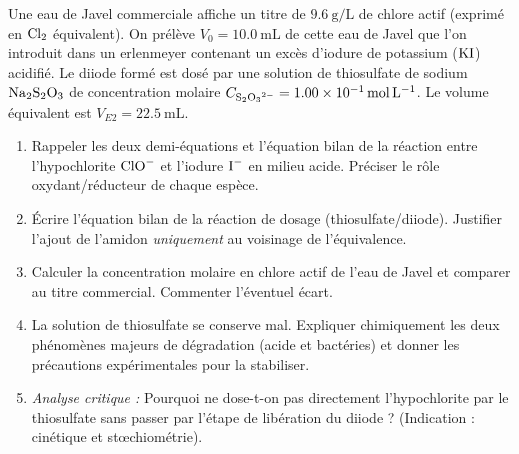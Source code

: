\documentclass[11pt]{article}
\begin{document}
\begin{exercice}
Une eau de Javel commerciale affiche un titre de $\SI{9,6}{\gram\per\L}$ de chlore actif (exprimé en $\ce{Cl2}$ équivalent). On prélève $V_0 = \SI{10,0}{\mL}$ de cette eau de Javel que l'on introduit dans un erlenmeyer contenant un excès d'iodure de potassium ($\ce{KI}$) acidifié. Le diiode formé est dosé par une solution de thiosulfate de sodium $\ce{Na2S2O3}$ de concentration molaire $C_{\ce{S2O3^{2-}}} = \SI{1,00e-1}{\mol\per\L}$. Le volume équivalent est $V_{E2} = \SI{22,5}{\mL}$.
\begin{enumerate}
    \item Rappeler les deux demi-équations et l'équation bilan de la réaction entre l'hypochlorite $\ce{ClO-}$ et l'iodure $\ce{I-}$ en milieu acide. Préciser le rôle oxydant/réducteur de chaque espèce.
    \item Écrire l'équation bilan de la réaction de dosage (thiosulfate/diiode). Justifier l'ajout de l'amidon \textit{uniquement} au voisinage de l'équivalence.
    \item Calculer la concentration molaire en chlore actif de l'eau de Javel et comparer au titre commercial. Commenter l'éventuel écart.
    \item La solution de thiosulfate se conserve mal. Expliquer chimiquement les deux phénomènes majeurs de dégradation (acide et bactéries) et donner les précautions expérimentales pour la stabiliser.
    \item \textit{Analyse critique :} Pourquoi ne dose-t-on pas directement l'hypochlorite par le thiosulfate sans passer par l'étape de libération du diiode ? (Indication : cinétique et stœchiométrie).
\end{enumerate}
\end{exercice}
\end{document}

